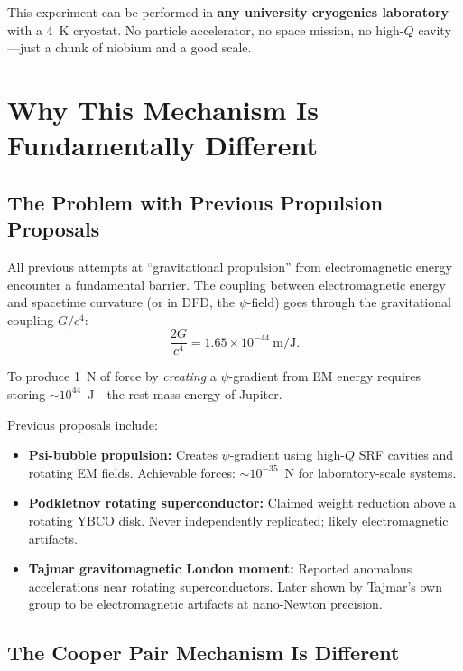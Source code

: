 \documentclass[12pt,a4paper]{article}
\theoremstyle{definition}
\theoremstyle{remark}
\begin{document}
This experiment can be performed in \textbf{any university cryogenics laboratory}
with a 4~K cryostat.  No particle accelerator, no space mission, no high-$Q$
cavity---just a chunk of niobium and a good scale.

\section{Why This Mechanism Is Fundamentally Different}\label{sec:comparison}

\subsection{The Problem with Previous Propulsion Proposals}

All previous attempts at ``gravitational propulsion'' from electromagnetic
energy encounter a fundamental barrier.  The coupling between electromagnetic
energy and spacetime curvature (or in DFD, the $\psi$-field) goes through the
gravitational coupling $G/c^4$:
\begin{equation}
\frac{2G}{c^4} = 1.65 \times 10^{-44}~\text{m/J}.
\end{equation}

To produce 1~N of force by \emph{creating} a $\psi$-gradient from EM energy
requires storing $\sim 10^{44}$~J---the rest-mass energy of Jupiter.

Previous proposals include:
\begin{itemize}
\item \textbf{Psi-bubble propulsion:} Creates $\psi$-gradient using high-$Q$ SRF
cavities and rotating EM fields.  Achievable forces: $\sim 10^{-35}$~N for
laboratory-scale systems.
\item \textbf{Podkletnov rotating superconductor:} Claimed weight reduction above
a rotating YBCO disk.  Never independently replicated; likely electromagnetic
artifacts.
\item \textbf{Tajmar gravitomagnetic London moment:} Reported anomalous
accelerations near rotating superconductors.  Later shown by Tajmar's own
group to be electromagnetic artifacts at nano-Newton precision.
\end{itemize}

\subsection{The Cooper Pair Mechanism Is Different}
\end{document}
